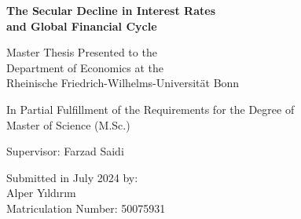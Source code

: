 \begin{titlepage}
    \begin{center}
        \vspace*{2cm}
            
        \LARGE
        \textbf{The Secular Decline in Interest Rates \\ and Global Financial Cycle}
            
        \vspace{3cm}

        \large
        Master Thesis Presented to the \\ Department of Economics at the \\
        Rheinische Friedrich-Wilhelms-Universität Bonn

        \vspace{1.5cm}

        In Partial Fulfillment of the Requirements for the Degree of \\
        Master of Science (M.Sc.)

        \vfill

        Supervisor: Farzad Saidi

        \vspace{1cm}

        Submitted in July 2024 by:\\
        Alper Yıldırım \\
        Matriculation Number: 50075931
            
    \end{center}
\end{titlepage}